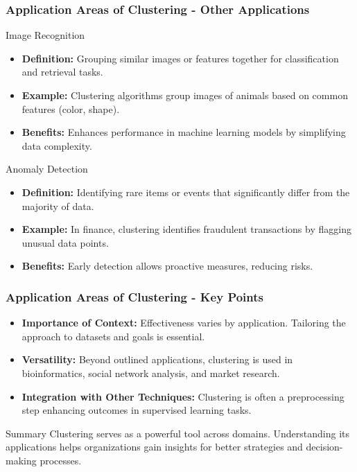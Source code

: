 \documentclass[aspectratio=169]{beamer}
\begin{document}
\begin{frame}[fragile]
    \frametitle{Application Areas of Clustering - Other Applications}
    \begin{block}{Image Recognition}
        \begin{itemize}
            \item \textbf{Definition:} Grouping similar images or features together for classification and retrieval tasks.
            \item \textbf{Example:} Clustering algorithms group images of animals based on common features (color, shape).
            \item \textbf{Benefits:} Enhances performance in machine learning models by simplifying data complexity.
        \end{itemize}
    \end{block}

    \begin{block}{Anomaly Detection}
        \begin{itemize}
            \item \textbf{Definition:} Identifying rare items or events that significantly differ from the majority of data.
            \item \textbf{Example:} In finance, clustering identifies fraudulent transactions by flagging unusual data points.
            \item \textbf{Benefits:} Early detection allows proactive measures, reducing risks.
        \end{itemize}
    \end{block}
\end{frame}

\begin{frame}[fragile]
    \frametitle{Application Areas of Clustering - Key Points}
    \begin{itemize}
        \item \textbf{Importance of Context:} Effectiveness varies by application. Tailoring the approach to datasets and goals is essential.
        \item \textbf{Versatility:} Beyond outlined applications, clustering is used in bioinformatics, social network analysis, and market research.
        \item \textbf{Integration with Other Techniques:} Clustering is often a preprocessing step enhancing outcomes in supervised learning tasks.
    \end{itemize}

    \begin{block}{Summary}
        Clustering serves as a powerful tool across domains. Understanding its applications helps organizations gain insights for better strategies and decision-making processes.
    \end{block}
\end{frame}
\end{document}
